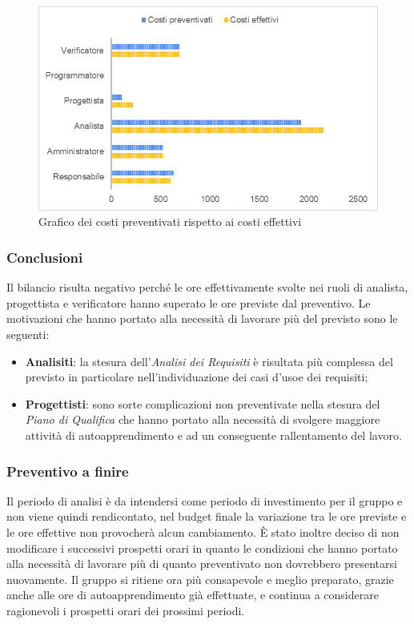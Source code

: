 	\begin{figure} [H]
		\includegraphics[width=\linewidth]{./img/Grafici/14.png}
		\caption{Grafico dei costi preventivati rispetto ai costi effettivi}
	\end{figure}

		\subsubsection{Conclusioni}
		Il bilancio risulta negativo perché le ore effettivamente svolte nei ruoli di analista, progettista e verificatore hanno superato le ore previste dal preventivo.
		Le motivazioni che hanno portato alla necessità di lavorare più del previsto sono le seguenti:
		\begin{itemize}
			\item \textbf{Analisiti}: la stesura dell'\textit{Analisi dei Requisiti} è risultata più complessa del previsto in particolare nell'individuazione dei casi d'uso\glosp e dei requisiti;
			\item \textbf{Progettisti}: sono sorte complicazioni non preventivate nella stesura del \textit{Piano di Qualifica} che hanno portato alla necessità di svolgere maggiore attività di autoapprendimento e ad un conseguente rallentamento del lavoro.
		\end{itemize}
		\subsubsection{Preventivo a finire}
		Il periodo di analisi è da intendersi come periodo di investimento per il gruppo e non viene quindi rendicontato, nel budget finale la variazione tra le ore previste e le ore effettive non provocherà alcun cambiamento. 
		È stato inoltre deciso di non modificare i successivi prospetti orari in quanto le condizioni che hanno portato alla necessità di lavorare più di quanto preventivato non dovrebbero presentarsi nuovamente. Il gruppo si ritiene ora più consapevole e meglio preparato, grazie anche alle ore di autoapprendimento già effettuate, e continua a considerare ragionevoli i prospetti orari dei prossimi periodi.
		
